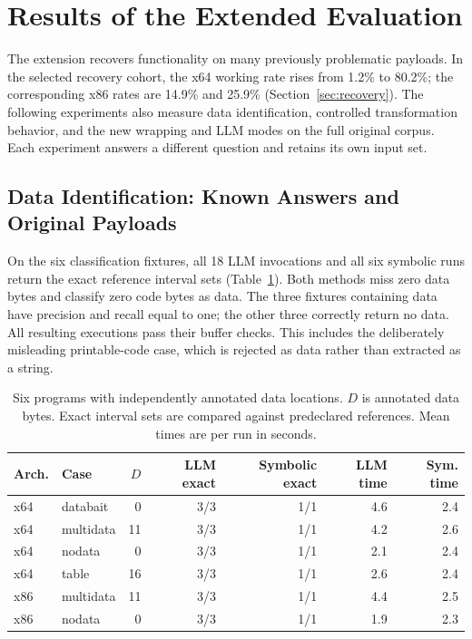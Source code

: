\section{Results of the Extended Evaluation}\label{sec:extended_results}
The extension recovers functionality on many previously problematic
payloads. In the selected recovery cohort, the x64 working rate rises
from 1.2\% to 80.2\%; the corresponding x86 rates are 14.9\% and 25.9\%
(Section~\ref{sec:recovery}). The following experiments also measure
data identification, controlled transformation behavior, and the new wrapping
and LLM modes on the full original corpus. Each experiment answers a
different question and retains its own input set.

\subsection{Data Identification: Known Answers and Original Payloads}
On the six classification fixtures, all 18 LLM invocations and all
six symbolic runs return the exact reference interval sets
(Table~\ref{tab:new_classifier}). Both methods miss zero data bytes and
classify zero code bytes as data. The three fixtures containing data have
precision and recall equal to one; the other three correctly return no
data. All resulting executions pass their buffer checks. This includes
the deliberately misleading printable-code case, which is rejected as
data rather than extracted as a string.


\begin{table}[t]
\caption{Six programs with independently annotated data locations. $D$ is annotated data bytes.
Exact interval sets are compared against predeclared references.
Mean times are per run in seconds.}
\label{tab:new_classifier}
\centering\small\setlength{\tabcolsep}{4pt}
\begin{tabular}{@{}llrrrrr@{}}
\toprule
Arch. & Case & $D$ & LLM exact & Symbolic exact & LLM time & Sym. time \\
\midrule
x64 & databait & 0 & 3/3 & 1/1 & 4.6 & 2.4 \\
x64 & multidata & 11 & 3/3 & 1/1 & 4.2 & 2.6 \\
x64 & nodata & 0 & 3/3 & 1/1 & 2.1 & 2.4 \\
x64 & table & 16 & 3/3 & 1/1 & 2.6 & 2.4 \\
x86 & multidata & 11 & 3/3 & 1/1 & 4.4 & 2.5 \\
x86 & nodata & 0 & 3/3 & 1/1 & 1.9 & 2.3 \\
\bottomrule
\end{tabular}
\end{table}


